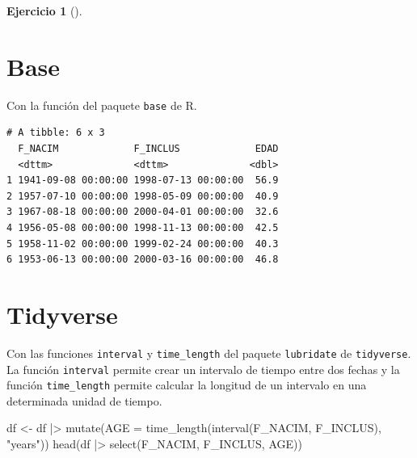 \documentclass[
  a4paper,
]{scrreport}
\newenvironment{Shaded}{\begin{snugshade}}{\end{snugshade}}
\newcommand{\AttributeTok}[1]{\textcolor[rgb]{0.40,0.45,0.13}{#1}}
\newcommand{\DecValTok}[1]{\textcolor[rgb]{0.68,0.00,0.00}{#1}}
\newcommand{\FunctionTok}[1]{\textcolor[rgb]{0.28,0.35,0.67}{#1}}
\newcommand{\NormalTok}[1]{\textcolor[rgb]{0.00,0.23,0.31}{#1}}
\newcommand{\OtherTok}[1]{\textcolor[rgb]{0.00,0.23,0.31}{#1}}
\newcommand{\SpecialCharTok}[1]{\textcolor[rgb]{0.37,0.37,0.37}{#1}}
\newcommand{\StringTok}[1]{\textcolor[rgb]{0.13,0.47,0.30}{#1}}
\theoremstyle{definition}
\newtheorem{exercise}{Ejercicio}[chapter]
\theoremstyle{remark}
\begin{document}
\begin{exercise}[]
\begin{enumerate}
\begin{tcolorbox}
  \section{Base}

  Con la función del paquete \texttt{base} de R.

\begin{Shaded}
\end{Shaded}

\begin{verbatim}
# A tibble: 6 x 3
  F_NACIM             F_INCLUS             EDAD
  <dttm>              <dttm>              <dbl>
1 1941-09-08 00:00:00 1998-07-13 00:00:00  56.9
2 1957-07-10 00:00:00 1998-05-09 00:00:00  40.9
3 1967-08-18 00:00:00 2000-04-01 00:00:00  32.6
4 1956-05-08 00:00:00 1998-11-13 00:00:00  42.5
5 1958-11-02 00:00:00 1999-02-24 00:00:00  40.3
6 1953-06-13 00:00:00 2000-03-16 00:00:00  46.8
\end{verbatim}

  \section{Tidyverse}

  Con las funciones \texttt{interval} y \texttt{time\_length} del
  paquete \texttt{lubridate} de \texttt{tidyverse}. La función
  \texttt{interval} permite crear un intervalo de tiempo entre dos
  fechas y la función \texttt{time\_length} permite calcular la longitud
  de un intervalo en una determinada unidad de tiempo.

\begin{Shaded}
\begin{Highlighting}[]
\NormalTok{df }\OtherTok{\textless{}{-}}\NormalTok{ df }\SpecialCharTok{|\textgreater{}} \FunctionTok{mutate}\NormalTok{(}\AttributeTok{AGE =} \FunctionTok{time\_length}\NormalTok{(}\FunctionTok{interval}\NormalTok{(F\_NACIM, F\_INCLUS), }\StringTok{"years"}\NormalTok{))}
\FunctionTok{head}\NormalTok{(df }\SpecialCharTok{|\textgreater{}}  \FunctionTok{select}\NormalTok{(F\_NACIM, F\_INCLUS, AGE))}
\end{Highlighting}
\end{Shaded}


\end{tcolorbox}
\end{enumerate}
\end{exercise}
\end{document}
